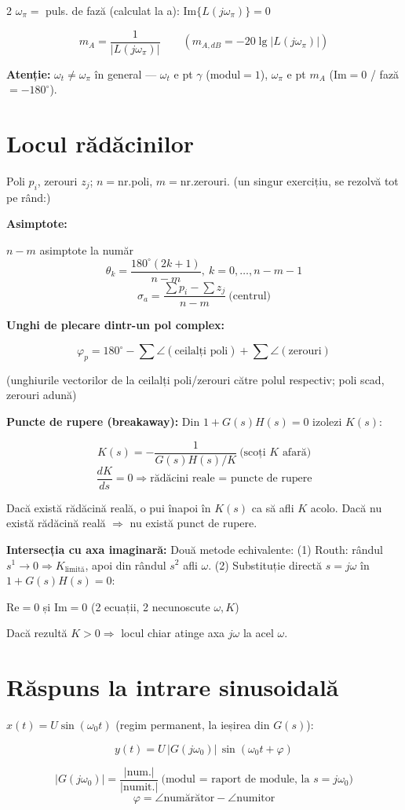 \documentclass[8pt,a4paper]{extarticle}
\begin{document}
\begin{multicols}{2}
$\omega_\pi=$ puls. de fază (calculat la a): $\mathrm{Im}\{L(j\omega_\pi)\}=0$
\begin{keyeq}
$$m_A=\frac1{|L(j\omega_\pi)|}\qquad (m_{A,dB}=-20\lg|L(j\omega_\pi)|)$$
\end{keyeq}
\textbf{Atenție:} $\omega_t\ne\omega_\pi$ în general --- $\omega_t$ e pt $\gamma$ (modul$=1$), $\omega_\pi$ e pt $m_A$ (Im$=0$ / fază$=-180^\circ$).

\section{Locul rădăcinilor}
Poli $p_i$, zerouri $z_j$; $n=$nr.poli, $m=$nr.zerouri. (un singur exercițiu, se rezolvă tot pe rând:)

\textbf{Asimptote:}
\begin{keyeq}
$n-m$ asimptote la număr
$$\theta_k=\frac{180^\circ(2k+1)}{n-m},\ k=0,\dots,n{-}m{-}1$$
$$\sigma_a=\frac{\sum p_i-\sum z_j}{n-m}\ \text{(centrul)}$$
\end{keyeq}

\textbf{Unghi de plecare dintr-un pol complex:}
\begin{keyeq}
$$\varphi_p=180^\circ-\sum\angle(\text{ceilalți poli})+\sum\angle(\text{zerouri})$$
\end{keyeq}
(unghiurile vectorilor de la ceilalți poli/zerouri către polul respectiv; poli scad, zerouri adună)

\textbf{Puncte de rupere (breakaway):} Din $1+G(s)H(s)=0$ izolezi $K(s)$:
\begin{keyeq}
$$K(s)=-\frac1{G(s)H(s)/K}\ \text{(scoți }K\text{ afară)}$$
$$\frac{dK}{ds}=0 \Rightarrow \text{rădăcini reale = puncte de rupere}$$
\end{keyeq}
Dacă există rădăcină reală, o pui înapoi în $K(s)$ ca să afli $K$ acolo. Dacă nu există rădăcină reală $\Rightarrow$ nu există punct de rupere.

\textbf{Intersecția cu axa imaginară:} Două metode echivalente:
(1) Routh: rândul $s^1\to0 \Rightarrow K_{\text{limită}}$, apoi din rândul $s^2$ afli $\omega$.
(2) Substituție directă $s=j\omega$ în $1+G(s)H(s)=0$:
\begin{keyeq}
$\mathrm{Re}=0$ și $\mathrm{Im}=0$ (2 ecuații, 2 necunoscute $\omega,K$)
\end{keyeq}
Dacă rezultă $K>0 \Rightarrow$ locul chiar atinge axa $j\omega$ la acel $\omega$.

\section{Răspuns la intrare sinusoidală}
$x(t)=U\sin(\omega_0t)$ (regim permanent, la ieșirea din $G(s)$):
\begin{keyeq}
$$y(t)=U\,|G(j\omega_0)|\,\sin(\omega_0t+\varphi)$$
\end{keyeq}
$$|G(j\omega_0)|=\frac{|\text{num.}|}{|\text{numit.}|}\ \text{(modul = raport de module, la }s=j\omega_0)$$
$$\varphi=\angle\text{numărător}-\angle\text{numitor}$$


\end{multicols}
\end{document}
